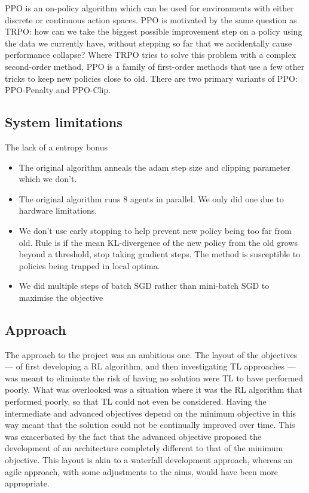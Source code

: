 \documentclass[12pt,a4paper]{article}
\begin{document}
PPO is an on-policy algorithm which can be used for environments with either discrete or continuous action spaces. PPO is motivated by the same question as TRPO: how can we take the biggest possible improvement step on a policy using the data we currently have, without stepping so far that we accidentally cause performance collapse? Where TRPO tries to solve this problem with a complex second-order method, PPO is a family of first-order methods that use a few other tricks to keep new policies close to old. There are two primary variants of PPO: PPO-Penalty and PPO-Clip.

\subsection{System limitations}
The lack of a entropy bonus 
\begin{itemize}
    \item The original algorithm anneals the adam step size and clipping parameter which we don't.
    \item The original algorithm runs 8 agents in parallel. We only did one due to hardware limitations.
    \item We don't use early stopping to help prevent new policy being too far from old. Rule is if the mean KL-divergence of the new policy from the old grows beyond a threshold, stop taking gradient steps. The method is susceptible to policies being trapped in local optima.
    \item We did multiple steps of batch SGD rather than mini-batch SGD to maximise the objective
\end{itemize}


\subsection{Approach}
The approach to the project was an ambitious one. The layout of the objectives --- of first developing a RL algorithm, and then investigating TL approaches --- was meant to eliminate the risk of having no solution were TL to have performed poorly. What was overlooked was a situation where it was the RL algorithm that performed poorly, so that TL could not even be considered. Having the intermediate and advanced objectives depend on the minimum objective in this way meant that the solution could not be continually improved over time. This was exacerbated by the fact that the advanced objective proposed the development of an architecture completely different to that of the minimum objective. This layout is akin to a waterfall development approach, whereas an agile approach, with some adjustments to the aims, would have been more appropriate. 
\end{document}
